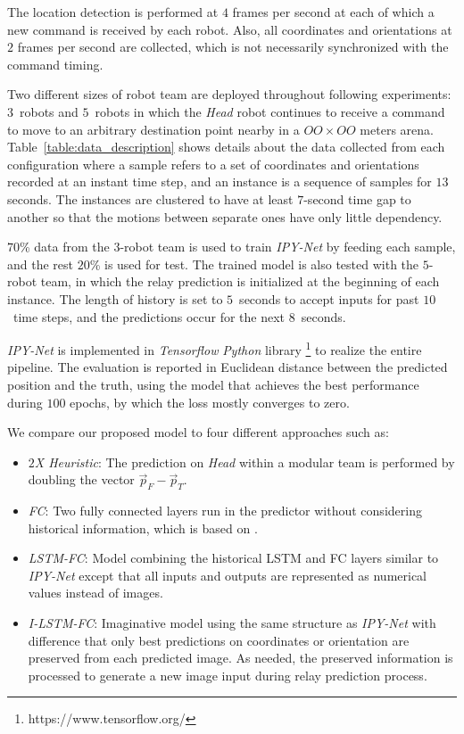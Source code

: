 \documentclass[letterpaper, 10 pt, conference]{ieeeconf}  %
\begin{document}
	The location detection is performed at $4$ frames per second at each of which 
	a new command is received by each robot. Also, 
	all coordinates and orientations at $2$ frames per second are collected, which 
	is not necessarily synchronized with the command timing. 
	
	Two different sizes of robot team are deployed throughout following experiments: 
	$3$~robots and $5$~robots in which the \emph{Head} robot continues to receive a command to 
	move to an arbitrary destination point nearby in a $OO \times OO$ meters arena. 
	Table~\ref{table:data_description} shows details about the data collected from 
	each configuration where a sample refers to a set of coordinates and orientations recorded 
	at an instant time step, and an instance is a sequence of samples for $13$ seconds. 
	The instances are clustered to have at least $7$-second time gap to another so that
	the motions between separate ones have only little dependency. 
	
	$70$\% data from the $3$-robot team is used to train \emph{IPY-Net} by feeding each sample, 
	and the rest $20$\% is used for test. 
	The trained model is also tested with the $5$-robot team, in which the relay prediction is 
	initialized at the beginning of each instance. 
	The length of history is set to $5$~seconds to accept inputs for past $10$~time steps, and 
	the predictions occur for the next $8$~seconds.  
	 	
	\emph{IPY-Net} is implemented in \emph{Tensorflow} \emph{Python} library \footnote{https://www.tensorflow.org/} 
	to realize the entire pipeline. The evaluation is reported in Euclidean distance between 
	the predicted position and the truth, using the model that achieves the best performance 
	during $100$ epochs, by which the loss mostly converges to zero. 

	We compare our proposed model to four different approaches such as: 
	\begin{itemize}
		\item \emph{$2$X Heuristic}: 
		The prediction on \emph{Head} within a modular team is performed by doubling the vector 
		$\vec{p}_{F} - \vec{p}_{T}$.
		
		\item \emph{FC}: 
		Two fully connected layers run in the predictor without considering historical 
		information, which is based on \cite{Choi17}.  
				
		\item \emph{LSTM-FC}: 
		Model combining the historical LSTM and FC layers similar to \emph{IPY-Net} except that 
		all inputs and outputs are represented as numerical values instead of images. 
		
		\item \emph{I-LSTM-FC}: 
		Imaginative model using the same structure as \emph{IPY-Net} with difference that 
		only best predictions on coordinates or orientation are preserved from each predicted image. 
		As needed, the preserved information is processed to generate a new image input during 
		relay prediction process.
	\end{itemize}	
\end{document}
